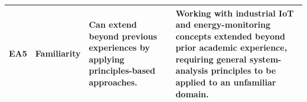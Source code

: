 \begin{longtable}[H]{|p{1.5cm}|p{4cm}|p{4cm}|p{4cm}|}
\textbf{EA5} &
Familiarity &
Can extend beyond previous experiences by applying principles-based approaches. &
Working with industrial IoT and energy-monitoring concepts extended beyond prior academic experience, requiring general system-analysis principles to be applied to an unfamiliar domain. \\
\hline

\end{longtable}
